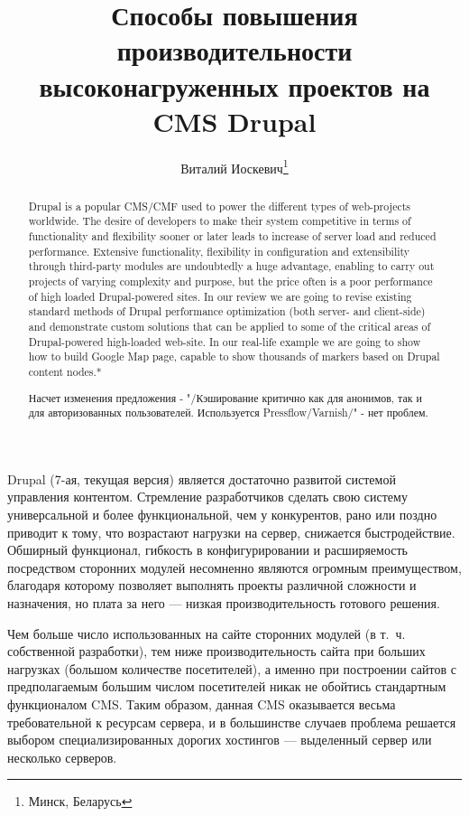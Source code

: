\documentclass[10pt, a5paper]{article}
\begin{document}
\title{Способы повышения производительности высоконагруженных проектов на CMS Drupal}

\author{Виталий Иоскевич\footnote{Минск, Беларусь}}
\date{}
\maketitle
\renewcommand{\abstractname}{Abstract}
\begin{abstract}
Drupal is a popular CMS/CMF used to power the different types of web-projects worldwide. The desire of developers to make their system competitive in terms of functionality and flexibility sooner or later leads to increase of server load and reduced performance. Extensive functionality, flexibility in configuration and extensibility through third-party modules are undoubtedly a huge advantage, enabling to carry out projects of varying complexity and purpose, but the price often is a poor performance of high loaded Drupal-powered sites.
In our review we are going to revise existing standard methods of Drupal performance optimization (both server- and client-side) and demonstrate custom solutions that can be applied to some of the critical areas of Drupal-powered high-loaded web-site. In our real-life example we are going to show how to build Google Map page, capable to show thousands of markers based on Drupal content nodes.*

Насчет изменения предложения - "/Кэширование критично как для анонимов, так и для авторизованных пользователей. Используется Pressflow/Varnish/" - нет проблем. 
\end{abstract}
  
Drupal (7-ая, текущая версия) является достаточно развитой системой управления контентом. Стремление разработчиков сделать свою систему универсальной и более функциональной, чем у конкурентов, рано или поздно приводит к тому, что возрастают нагрузки на сервер, снижается быстродействие. Обширный функционал, гибкость в конфигурировании и расширяемость посредством сторонних модулей несомненно являются огромным преимуществом, благодаря которому позволяет выполнять проекты различной сложности и назначения, но плата за него --- низкая производительность готового решения. 

Чем больше число использованных на сайте сторонних модулей (в т.~ч. собственной разработки), тем ниже производительность сайта при больших нагрузках (большом количестве посетителей), а именно при построении сайтов с предполагаемым большим числом  посетителей никак не обойтись стандартным функционалом CMS. Таким образом, данная CMS оказывается весьма требовательной к ресурсам сервера, и в большинстве случаев проблема  решается выбором специализированных дорогих хостингов --- выделенный сервер или несколько серверов. 
\end{document}
